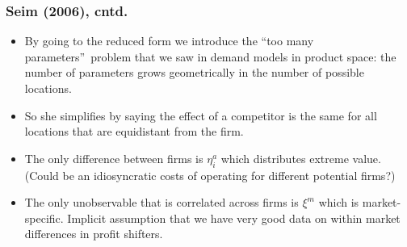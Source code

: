 \begin{frame}%

\frametitle{Seim (2006), cntd.}

\begin{itemize}
\item By going to the reduced form we introduce the \textquotedblleft too
many parameters\textquotedblright\ problem that we saw in demand models in
product space: the number of parameters grows geometrically in the number of
possible locations.

\item So she simplifies by saying the effect of a competitor is the same for
all locations that are equidistant from the firm.

\item The only difference between firms is $\eta _{i}^{a}$ which distributes
extreme value. (Could be an idiosyncratic costs of operating for different
potential firms?)

\item The only unobservable that is correlated across firms is $\xi ^{m}$
which is market-specific. Implicit assumption that we have very good data on
within market differences in profit shifters.
\end{itemize}

\end{frame}%

